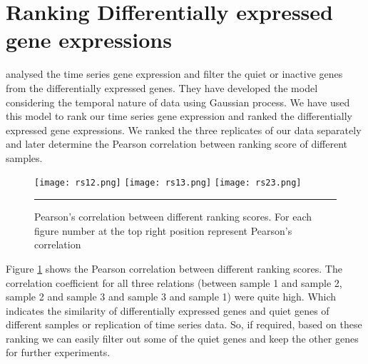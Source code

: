 \section{Ranking Differentially expressed gene expressions}
\cite{Kalaitzis:2011} analysed the time series gene expression and filter the quiet or inactive genes from the differentially expressed genes. They have developed the model considering the temporal nature of data using Gaussian process. We have used this model to rank our time series gene expression and ranked the differentially expressed gene expressions. We ranked the three replicates of our data separately and later determine the Pearson correlation between ranking score of different samples.

\begin{figure}
	\centering
		\texttt{[image: rs12.png]}
		\texttt{[image: rs13.png]}
		\texttt{[image: rs23.png]}
		\rule{35em}{0.5pt}
	\caption[Pearson's correlation between different ranking scores]
		{Pearson's correlation between different ranking scores. For each figure number at the top right position represent Pearson's correlation}
	\label{fig:ranking_scores}
\end{figure}

Figure \ref{fig:ranking_scores} shows the Pearson correlation between different ranking scores. The correlation coefficient for all three relations (between sample 1 and sample 2, sample 2 and sample 3 and
sample 3 and sample 1) were quite high. Which indicates the similarity of differentially expressed genes and quiet genes of different samples or replication of time series data. So, if required, based on these ranking we can easily filter out some of the quiet genes and keep the other genes for further experiments.



% 
%

